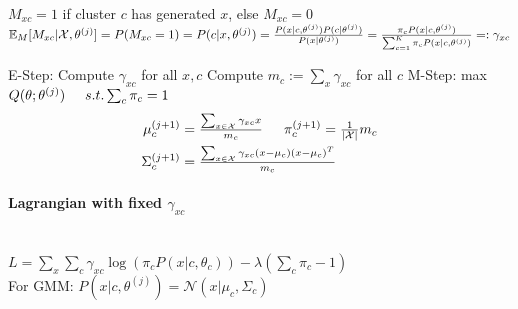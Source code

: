 $M_{xc} = 1$ if cluster $c$ has generated $x$, else $M_{xc} = 0$
$\\ \mathbb{E}_M[M_{xc}|\mathcal{X}, \theta^{(j)}] = P(M_{xc}=1) = P(c | x, \theta^{(j)}) = 
\frac{P(x|c,\theta^{(j)}) P(c|\theta^{(j)})}{P(x|\theta^{(j)})}
= \frac{\pi_c P(x|c,\theta^{(j)})}{\sum_{c=1}^K \pi_c P(x|c,\theta^{(j)})} 
=: \gamma_{xc}$
\begin{algorithmic}[1]
	\State E-Step:
		\tab Compute $\gamma_{xc}$ for all $x, c$
		\tab Compute $m_c := \sum_x \gamma_{xc}$ for all $c$
	\State M-Step: max $Q(\theta; \theta^{(j)}) \hspace{5mm} s.t. \sum_c \pi_c = 1$
    	\vspace{-3mm}
    	\addtolength{\jot}{-3mm}
		\begin{align*}
			\mu_c^{(j+1)} &= \tfrac{\sum_{x \in \mathcal{X}} \gamma_{xc} x}{m_c} \hskip 15pt  
			\pi_c^{(j+1)} = \tfrac{1}{|\mathcal{X}|} m_c \\
			\Sigma_c^{(j+1)} &= \tfrac{\sum_{x \in \mathcal{X}} \gamma_{xc}(x-\mu_c)(x-\mu_c)^T}
				{m_c} 
		\end{align*}
        \vspace{-6mm}
	\EndWhile
\end{algorithmic}
\vspace{-6mm}
\paragraph{Lagrangian with fixed $\gamma_{xc}$} \mbox{}\\
$L = \sum_x \sum_c \gamma_{xc} \log(\pi_c P(x|c,\theta_c)) - 
\lambda(\sum_c \pi_c - 1)$\\
For GMM: $P(x|c,\theta^{(j)}) = \mathcal{N}(x | \mu_c, \Sigma_c)$